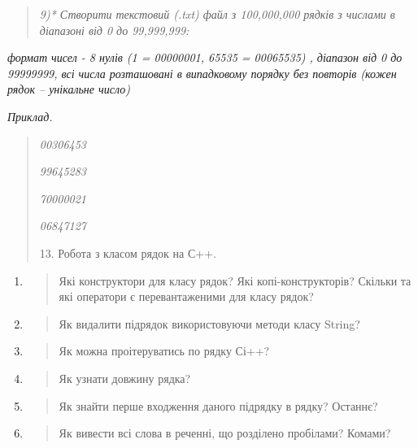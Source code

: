 \documentclass[]{article}
\begin{document}
\begin{quote}
\emph{9)* Створити текстовий (.txt) файл з 100,000,000 рядків з числами
в діапазоні від 0 до 99,999,999:}
\end{quote}

\emph{формат чисел - 8 нулів (1 = 00000001, 65535 = 00065535) , діапазон
від 0 до 99999999, всі числа розташовані в випадковому порядку без
повторів (кожен рядок -- унікальне число)}

\emph{Приклад.}

\begin{quote}
\emph{00306453 }

\emph{99645283 }

\emph{70000021 }

\emph{06847127 }

13. Робота з класом рядок на С++.
\end{quote}

\begin{enumerate}
\def\labelenumi{\arabic{enumi})}
\item
  \begin{quote}
  Які конструктори для класу рядок? Які копі-конструкторів? Скільки та
  які оператори є перевантаженими для класу рядок?
  \end{quote}
\item
  \begin{quote}
  Як видалити підрядок використовуючи методи класу String?
  \end{quote}
\item
  \begin{quote}
  Як можна проітеруватись по рядку Сі++?
  \end{quote}
\item
  \begin{quote}
  Як узнати довжину рядка?
  \end{quote}
\item
  \begin{quote}
  Як знайти перше входження даного підрядку в рядку? Останнє?
  \end{quote}
\item
  \begin{quote}
  Як вивести всі слова в реченні, що розділено пробілами? Комами?
  \end{quote}
\end{enumerate}
\end{document}
